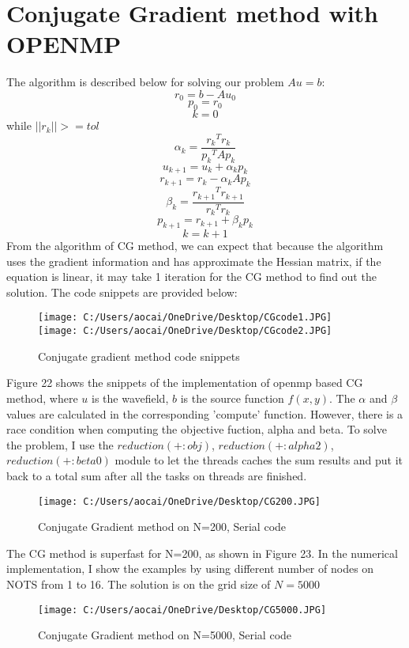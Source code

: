 \documentclass[12pt]{article}
\begin{document}
\section{Conjugate Gradient method with OPENMP}
The algorithm is described below for solving our problem $Au=b$:
$$r_0 = b - Au_0 $$
$$p_0 = r_0 $$
$$k = 0$$
while $\left|| r_k \right|| >= tol $
$${\alpha}_k = \frac{{r_k}^T r_k}{{p_k}^T Ap_k}$$
$$u_{k+1} = u_k +{\alpha}_k p_k$$
$$r_{k+1} = r_k -{\alpha}_k Ap_k$$
$${\beta}_k = \frac{{r_{k+1}}^T{r_{k+1}}}{{r_k}^Tr_k}$$
$$p_{k+1} = r_{k+1} + \beta_kp_k$$
$$k=k+1$$
From the algorithm of CG method, we can expect that because the algorithm uses the gradient information and has approximate the Hessian matrix, if the equation is linear, it may take 1 iteration for the CG method to find out the solution. The code snippets are provided below:

\begin{figure}[H]
	\centering
	\texttt{[image: C:/Users/aocai/OneDrive/Desktop/CGcode1.JPG]}
	\texttt{[image: C:/Users/aocai/OneDrive/Desktop/CGcode2.JPG]}
	\caption[Optional caption]{Conjugate gradient method code snippets}
	\label{fig:sor}
\end{figure}
Figure 22 shows the snippets of the implementation of openmp based CG method, where $u$ is the wavefield, $b$ is the source function $f(x,y)$. The $\alpha$ and $\beta$ values are calculated in the corresponding 'compute'  function. However, there is a race condition when computing the objective fuction, alpha and beta. To solve the problem, I use the $reduction(+:obj)$, $reduction(+:alpha2)$, $reduction(+:beta0)$ module to let the threads caches the sum results and put it back to a total sum after all the tasks on threads are finished.
\begin{figure}[H]
	\centering
	\texttt{[image: C:/Users/aocai/OneDrive/Desktop/CG200.JPG]}
	\caption[Optional caption]{Conjugate Gradient method on N=200, Serial code}
	\label{fig:CG200}
\end{figure}
The CG method is superfast for N=200, as shown in Figure 23. In the numerical implementation, I show the examples by using different number of nodes on NOTS from 1 to 16. The solution is on the grid size of $N=5000$

\begin{figure}[H]
	\centering
	\texttt{[image: C:/Users/aocai/OneDrive/Desktop/CG5000.JPG]}
	\caption[Optional caption]{Conjugate Gradient method on N=5000, Serial code}
	\label{fig:CG5000}
\end{figure}
\end{document}
